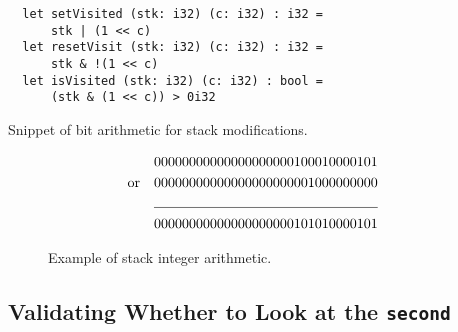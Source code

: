 \begin{listing}[H]
\begin{verbatim}
  let setVisited (stk: i32) (c: i32) : i32 =
      stk | (1 << c)
  let resetVisit (stk: i32) (c: i32) : i32 =
      stk & !(1 << c)
  let isVisited (stk: i32) (c: i32) : bool =
      (stk & (1 << c)) > 0i32
\end{verbatim}
\caption{Snippet of bit arithmetic for stack modifications.}
\label{lst:stack}
\end{listing}

\begin{figure}\label{fig:bits}
\begin{align*}
	&& &00000000000000000000100010000101 &\\ \text{or} 
	&& &00000000000000000000001000000000 &\\ 
	\cline{3-4}
	&& &00000000000000000000101010000101
\end{align*}
\caption{Example of stack integer arithmetic.}
\end{figure}













\subsection{Validating Whether to Look at the \texttt{second}}

